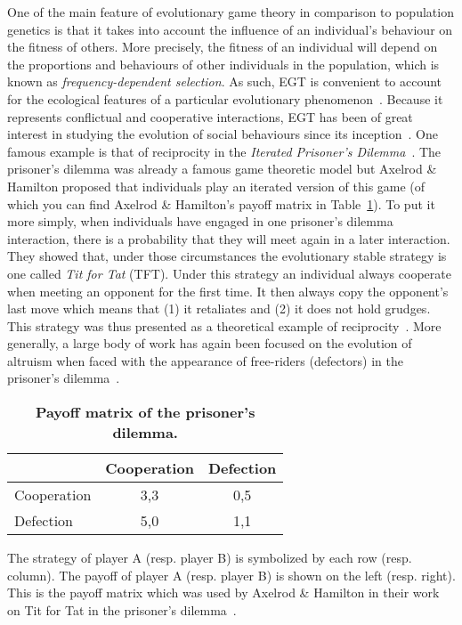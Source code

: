    One of the main feature of evolutionary game theory in comparison to population genetics is that it takes into account the influence of an individual's behaviour on the fitness of others. More precisely, the fitness of an individual will depend on the proportions and behaviours of other individuals in the population, which is known as \emph{frequency-dependent selection}. As such, EGT is convenient to account for the ecological features of a particular evolutionary phenomenon~\parencite{Hammerstein1994}. Because it represents conflictual and cooperative interactions, EGT has been of great interest in studying the evolution of social behaviours since its inception~\parencite{Bshary2015}. One famous example is that of reciprocity in the \emph{Iterated Prisoner's Dilemma}~\parencite{Axelrod1984}. The prisoner's dilemma was already a famous game theoretic model but Axelrod \& Hamilton proposed that individuals play an iterated version of this game (of which you can find Axelrod \& Hamilton's payoff matrix in Table~\ref{table:payoffIPD}). To put it more simply, when individuals have engaged in one prisoner's dilemma interaction, there is a probability that they will meet again in a later interaction. They showed that, under those circumstances the evolutionary stable strategy is one called \emph{Tit for Tat} (TFT). Under this strategy an individual always cooperate when meeting an opponent for the first time. It then always copy the opponent's last move which means that (1) it retaliates and (2) it does not hold grudges. This strategy was thus presented as a theoretical example of reciprocity~\parencite{Trivers1971}. More generally, a large body of work has again been focused on the evolution of altruism when faced with the appearance of free-riders (defectors) in the prisoner's dilemma~\parencite{Requejo2013a}.


    \begin{table}[ht]
    \centering
      \caption{\textbf{Payoff matrix of the prisoner's dilemma.}}
      \begin{tabular}{l|c|c}
        & Cooperation & Defection \\
        \hline
        Cooperation & 3,3 & 0,5 \\
        \hline
        Defection & 5,0 & 1,1 \\
        \hline
      \end{tabular}
      \begin{flushleft} The strategy of player A (resp. player B) is symbolized by each row (resp. column). The payoff of player A (resp. player B) is shown on the left (resp. right). This is the payoff matrix which was used by Axelrod \& Hamilton in their work on Tit for Tat in the prisoner's dilemma~\parencite{Axelrod1984}. 
      \end{flushleft}
    \label{table:payoffIPD}
    \end{table}


